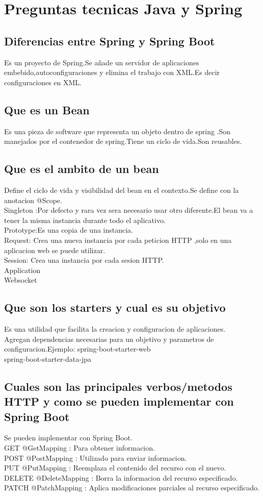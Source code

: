 \chapter{Preguntas tecnicas Java y Spring}
\section{Diferencias entre Spring y Spring Boot}
Es un proyecto de Spring.Se añade un servidor de aplicaciones embebido,autoconfiguraciones
y elimina el trabajo con XML.Es decir configuraciones en XML.
\section{Que es un Bean}
Es una pieza de software que representa un objeto dentro de spring .Son manejados por el contenedor de
spring.Tiene un ciclo de vida.Son reusables.
\section{Que es el ambito de un bean}
Define el ciclo de vida y visibilidad del bean en el contexto.Se define con la anotacion @Scope.\\
Singleton :Por defecto y rara vez sera necesario usar otro diferente.El bean va a tener la misma
instancia durante todo el aplicativo.\\
Prototype:Es una copia de una instancia.\\
Request: Crea una nueva instancia por cada peticion HTTP ,solo en una aplicacion web se puede utilizar.\\
Session: Crea una instancia por cada sesion HTTP.\\
Application\\
Websocket\\
\section{Que son los starters y cual es su objetivo}
Es una utilidad que facilita la creacion y configuracion de aplicaciones.\\
Agregan dependencias necesarias para un objetivo y parametros de configuracion.Ejemplo:
spring-boot-starter-web\\
spring-boot-starter-data-jpa
\section{Cuales son las principales verbos/metodos HTTP y como se pueden implementar con Spring Boot}
Se pueden implementar con Spring Boot.\\
GET @GetMapping : Para obtener informacion.\\
POST @PostMapping : Utilizado para enviar informacion.\\
PUT @PutMapping : Reemplaza el contenido del recurso con el nuevo.\\
DELETE @DeleteMapping : Borra la informacion del recurso especificado.\\
PATCH @PatchMapping : Aplica modificaciones parciales al recurso especificado.
